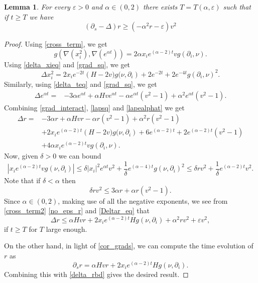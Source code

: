 \documentclass[leqno,11pt]{amsart}
\newtheorem{lemma}[theorem]{Lemma}
\theoremstyle{definition}
\newcommand{\p}{\partial}
\begin{document}
\begin{lemma}\label{r_evolve_ineq}
For every $\varepsilon>0$ and $\alpha\in (0,2)$ there exists $T=T(\alpha,\varepsilon)$ such that if $t\geq T$ we have 
\begin{equation}
(\partial_s-\Delta)r \geq (-\alpha^2 r-\varepsilon)v^2
\end{equation}
\end{lemma}
\begin{proof}
Using \eqref{cross_term}, we get 
\begin{equation}\label{grad_interact}
g(\nabla(x_i^2),\nabla(e^{\alpha t}))=2\alpha x_ie^{(\alpha-2)t}vg(\p_i,\nu).
\end{equation}
Using \eqref{delta_xieq} and \eqref{grad_sq}, we get
\begin{equation}\label{lapsq}
\Delta x_i^2=2x_ie^{-2t}\left(H-2v)g(\nu,\partial_i\right)+2e^{-2t}+2e^{-4t}g(\partial_i,\nu)^2.
\end{equation}
Similarly, using \eqref{delta_teq} and \eqref{grad_sq}, we get
\begin{align}\label{lapealphat}
\Delta e^{\alpha t}=&-3\alpha e^{\alpha t}+\alpha Hve^{\alpha t}-\alpha e^{\alpha t}(v^2-1)+\alpha^2 e^{\alpha t}(v^2-1).
\end{align}
Combining \eqref{grad_interact},  \eqref{lapsq} and \eqref{lapealphat}  we get
\begin{align}\label{Deltar_eq}
\Delta r=& -3\alpha r+\alpha Hvr-\alpha r(v^2-1)+\alpha^2 r(v^2-1) \nonumber\\
&+2x_ie^{(\alpha-2)t}\left(H-2v)g(\nu,\partial_i\right)+6e^{(\alpha-2)t}+2e^{(\alpha-2)t}(v^2-1)\\
&+4\alpha x_ie^{(\alpha-2)t}vg(\p_i,\nu) \nonumber.
\end{align}
{
Now, given $\delta>0$ we can bound
\begin{equation}\label{cross_term2}
|x_ie^{(\alpha-2)t}vg(\nu,\partial_i)| \leq \delta|x_i|^2e^{\alpha t}v^2+\frac{1}{\delta}e^{(\alpha-4)t}g(\nu,\partial_i)^2\leq \delta r v^2+\frac{1}{\delta}e^{(\alpha-2)t}v^2.
\end{equation}
Note that if $\delta<\alpha$ then 
\begin{equation}\label{no_eps_r}
\delta r v^2 \leq 3\alpha r+\alpha r(v^2-1).
\end{equation}
}
Since $\alpha\in (0,2)$, making use of all the negative exponents, we see from \eqref{cross_term2} \eqref{no_eps_r} and \eqref{Deltar_eq} that
\begin{equation}\label{delta_rbd}
\Delta r \leq \alpha Hvr +2x_ie^{(\alpha-2)t}Hg(\nu,\partial_i)+\alpha^2 rv^2+\varepsilon v^2,
\end{equation}
if $t\geq T$ for $T$ large enough. 

On the other hand, in light of \eqref{cor_grads}, we can compute the time evolution of $r$ as 
\begin{equation}
\partial_s r= \alpha Hvr+2x_ie^{(\alpha-2)t}H g(\nu,\partial_i).
\end{equation}
Combining this with \eqref{delta_rbd} gives the desired result.
\end{proof}
\end{document}

